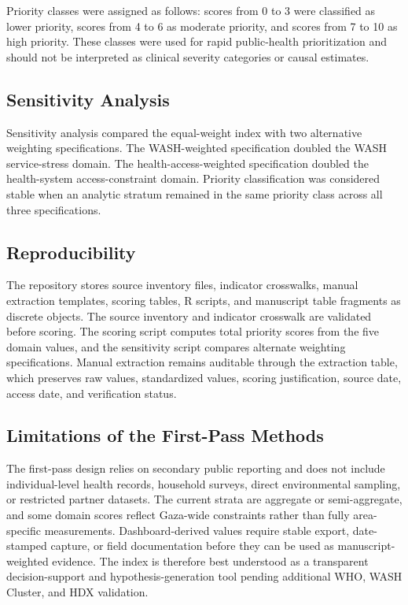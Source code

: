 Priority classes were assigned as follows: scores from 0 to 3 were classified as lower priority, scores from 4 to 6 as moderate priority, and scores from 7 to 10 as high priority. These classes were used for rapid public-health prioritization and should not be interpreted as clinical severity categories or causal estimates.

\subsection{Sensitivity Analysis}

Sensitivity analysis compared the equal-weight index with two alternative weighting specifications. The WASH-weighted specification doubled the WASH service-stress domain. The health-access-weighted specification doubled the health-system access-constraint domain. Priority classification was considered stable when an analytic stratum remained in the same priority class across all three specifications.

\subsection{Reproducibility}

The repository stores source inventory files, indicator crosswalks, manual extraction templates, scoring tables, R scripts, and manuscript table fragments as discrete objects. The source inventory and indicator crosswalk are validated before scoring. The scoring script computes total priority scores from the five domain values, and the sensitivity script compares alternate weighting specifications. Manual extraction remains auditable through the extraction table, which preserves raw values, standardized values, scoring justification, source date, access date, and verification status.

\subsection{Limitations of the First-Pass Methods}

The first-pass design relies on secondary public reporting and does not include individual-level health records, household surveys, direct environmental sampling, or restricted partner datasets. The current strata are aggregate or semi-aggregate, and some domain scores reflect Gaza-wide constraints rather than fully area-specific measurements. Dashboard-derived values require stable export, date-stamped capture, or field documentation before they can be used as manuscript-weighted evidence. The index is therefore best understood as a transparent decision-support and hypothesis-generation tool pending additional WHO, WASH Cluster, and HDX validation.

